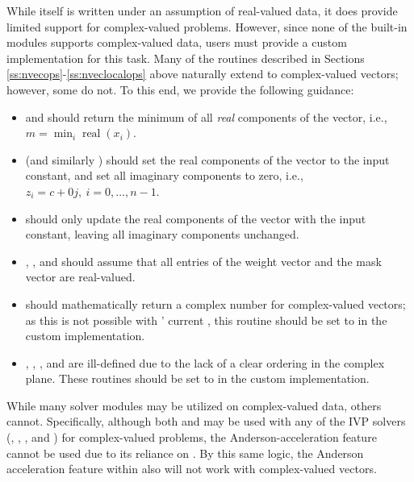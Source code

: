 While {\sundials} itself is written under an assumption of real-valued
data, it does provide limited support for complex-valued problems.
However, since none of the built-in {\nvector} modules supports
complex-valued data, users must provide a custom {\nvector}
implementation for this task.  Many of the {\nvector} routines
described in Sections \ref{ss:nvecops}-\ref{ss:nveclocalops} above
naturally extend to complex-valued vectors; however, some do not.  To
this end, we provide the following guidance:

\begin{itemize}
\item {} and  should return the minimum of
  all \emph{real} components of the vector, i.e.,  $m = \min_i
  \operatorname{real}(x_i) $.

\item {} (and similarly ) should
  set the real components of the vector to the input constant, and set
  all imaginary components to zero, i.e.,
  $z_i = c + 0 j,\: i=0,\ldots,n-1$.

\item {} should only update the real components of the
  vector with the input constant, leaving all imaginary components
  unchanged.

\item {}, , 
  and  should assume that all entries of the
  weight vector  and the mask vector  are real-valued.

\item {} should mathematically return a complex number
  for complex-valued vectors; as this is not possible with
  {\sundials}' current , this routine should
  be set to  in the custom {\nvector} implementation.

\item {}, , ,
   and 
  are ill-defined due to the lack of a clear ordering in the
  complex plane.  These routines should be set to 
  in the custom {\nvector} implementation.

\end{itemize}

While many {\sundials} solver modules may be utilized on
complex-valued data, others cannot.  Specifically, although both
{\sunnonlinsolnewton} and {\sunnonlinsolfixedpoint} may be used with
any of the IVP solvers ({\cvode}, {\cvodes}, {\ida}, {\idas} and
{\arkode}) for complex-valued problems, the Anderson-acceleration
feature {\sunnonlinsolfixedpoint} cannot be used due to its reliance
on .  By this same logic, the Anderson acceleration
feature within {\kinsol} also will not work with complex-valued
vectors.

